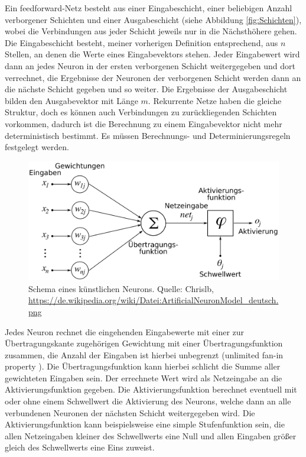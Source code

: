 \documentclass[
	12pt,
	a4paper,
	BCOR10mm,
	DIV14,
	listof=totoc,
	bibliography=totoc,
	headsepline
]{scrreprt}
\begin{document}
Ein feedforward-Netz besteht aus einer Eingabeschicht, einer beliebigen Anzahl verborgener Schichten und einer Ausgabeschicht (siehe Abbildung \ref{fig:Schichten}), wobei die Verbindungen aus jeder Schicht jeweils nur in die Nächsthöhere gehen. 
Die Eingabeschicht besteht, meiner vorherigen Definition entsprechend, aus $n$ Stellen, an denen die Werte eines Eingabevektors stehen. Jeder Eingabewert wird dann an jedes Neuron in der ersten verborgenen Schicht weitergegeben und dort verrechnet, die Ergebnisse der Neuronen der verborgenen Schicht werden dann an die nächste Schicht gegeben und so weiter.
Die Ergebnisse der Ausgabeschicht bilden den Ausgabevektor mit Länge $m$.
Rekurrente Netze haben die gleiche Struktur, doch es können auch Verbindungen zu zurückliegenden Schichten vorkommen, dadurch ist die Berechnung zu einem Eingabevektor nicht mehr deterministisch bestimmt. Es müssen Berechnungs- und Determinierungsregeln festgelegt werden. 

\begin{figure}[h]
	\begin{center}
		\includegraphics[totalheight=0.2\textheight]{Bilder/ArtificialNeuronModel_deutsch.png}
	\end{center}
	\caption{Schema eines künstlichen Neurons. Quelle: Chrislb, \url{https://de.wikipedia.org/wiki/Datei:ArtificialNeuronModel_deutsch.png}} %
	\label{fig:Neuron}
\end{figure}

Jedes Neuron rechnet die eingehenden Eingabewerte mit einer zur Übertragungskante zugehörigen Gewichtung mit einer Übertragungsfunktion zusammen, die Anzahl der Eingaben ist hierbei unbegrenzt (\glqq unlimited fan-in property\grqq{} \cite{Rojas:1996:NNS:235222}). Die Übertragungsfunktion kann hierbei schlicht die Summe aller gewichteten Eingaben sein. Der errechnete Wert wird als Netzeingabe an die Aktivierungsfunktion gegeben. 
Die Aktivierungsfunktion berechnet eventuell mit oder ohne einem Schwellwert die Aktivierung des Neurons, welche dann an alle verbundenen Neuronen der nächsten Schicht weitergegeben wird.
Die Aktivierungsfunktion kann beispielsweise eine simple Stufenfunktion sein, die allen Netzeingaben kleiner des Schwellwerts eine Null und allen Eingaben größer gleich des Schwellwerts eine Eins zuweist.
\end{document}
